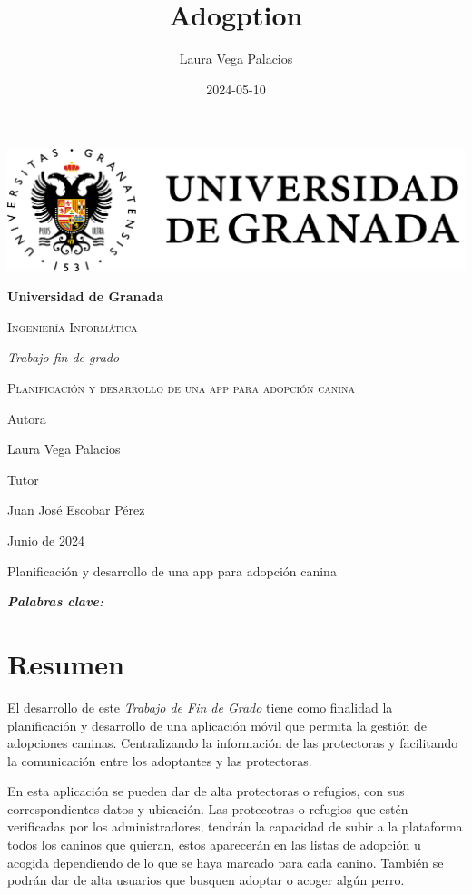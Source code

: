 \documentclass[a4paper, 12pt]{article}
\title{Adogption}
\date{2024-05-10}
\author{Laura Vega Palacios}
\providecommand{\keywords}[1]{\textbf{\textit{Palabras clave:}} #1}
\begin{document}
\begin{titlepage}
	\pagestyle{plain}
	\centering
	{\includegraphics[width=1\textwidth]{logoUGR.png}\par}
	{\bfseries\LARGE Universidad de Granada \par}
	{\scshape\Large Ingeniería Informática \par}
	\vspace{0.5cm}
	{\itshape\Large Trabajo fin de grado \par}
	{\scshape\Huge Planificación y desarrollo de una app para adopción canina \par}
	\vfill
	{\Large Autora \par}
	{\Large Laura Vega Palacios\par}

	{\Large Tutor \par}
	{\Large Juan José Escobar Pérez\par}
	\vfill
	{\Large Junio de 2024 \par}
\end{titlepage} 

\newpage
\thispagestyle{empty}
\mbox{}

\newpage
\pagestyle{plain}

\begin{center} 
{\LARGE Planificación y desarrollo de una app para adopción canina \par}
\end{center} 

\keywords{}
\section*{Resumen}
El desarrollo de este \textit{Trabajo de Fin de Grado} tiene como finalidad la planificación y desarrollo de una aplicación móvil que permita la gestión de adopciones caninas. Centralizando la información de las protectoras y facilitando la comunicación entre los adoptantes y las protectoras.

En esta aplicación se pueden dar de alta protectoras o refugios, con sus correspondientes datos y ubicación. Las protecotras o refugios que estén verificadas por los administradores, tendrán la capacidad de subir a la plataforma todos los caninos que quieran, estos aparecerán en las listas de adopción u acogida dependiendo de lo que se haya marcado para cada canino. También se podrán dar de alta usuarios que busquen adoptar o acoger algún perro.  
\end{document}
